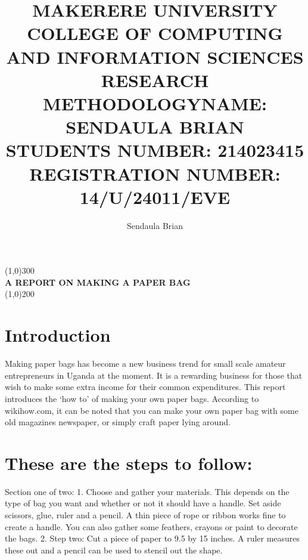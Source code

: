 \documentclass[12pt,letterpaper]{article}
\begin{document}
\begin{titlepage}
\begin{center}
\title{MAKERERE UNIVERSITY \\COLLEGE OF COMPUTING AND INFORMATION SCIENCES\\ RESEARCH METHODOLOGY}
\author{Sendaula Brian}
\maketitle
\end{center}
\begin{flushleft}
\begin{center}
\title{NAME:	     SENDAULA BRIAN\\
STUDENTS NUMBER:	 214023415\\
REGISTRATION NUMBER: 14/U/24011/EVE}
\maketitle
\end{center}
\end{flushleft}
\end{titlepage}
  \begin{center}
  \line(1,0){300}\\
  [0.25in]
  \huge{\bfseries A REPORT ON MAKING A PAPER BAG}\\
  [2mm]
  \line(1,0){200}\\
  \maketitle
  \end{center}

\section{Introduction}
Making paper bags has become a new business trend for small scale amateur entrepreneurs in Uganda at the moment. It is a rewarding business for those that wish to make some extra income for their common expenditures. This report introduces the ‘how to’ of making your own paper bags.
According to wikihow.com, it can be noted that you can make your own paper bag with some old magazines newspaper, or simply craft paper lying around.   
\section{These are the steps to follow:}

Section one of two:
1.	Choose and gather your materials. This depends on the type of bag you want and whether or not it should have a handle. Set aside scissors, glue, ruler and a pencil. A thin piece of rope or ribbon works fine to create a handle. You can also gather some feathers, crayons or paint to decorate the bags.
2.	Step two: Cut a piece of paper to 9.5 by 15 inches. A ruler measures these out and a pencil can be used to stencil out the shape.
\end{document}
